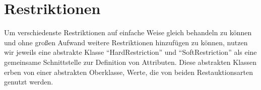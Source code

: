 \section{Restriktionen}\label{sec:restrictions}
Um verschiedenste Restriktionen auf einfache Weise gleich behandeln zu können
und ohne großen Aufwand weitere Restriktionen hinzufügen zu können,
nutzen wir jeweils eine abstrakte Klasse \enquote{HardRestriction} und \enquote{SoftRestriction}
als eine gemeinsame Schnittstelle zur Definition von Attributen.
Diese abstrakten Klassen erben von einer abstrakten Oberklasse, Werte, die von beiden Restauktionsarten genutzt werden.



